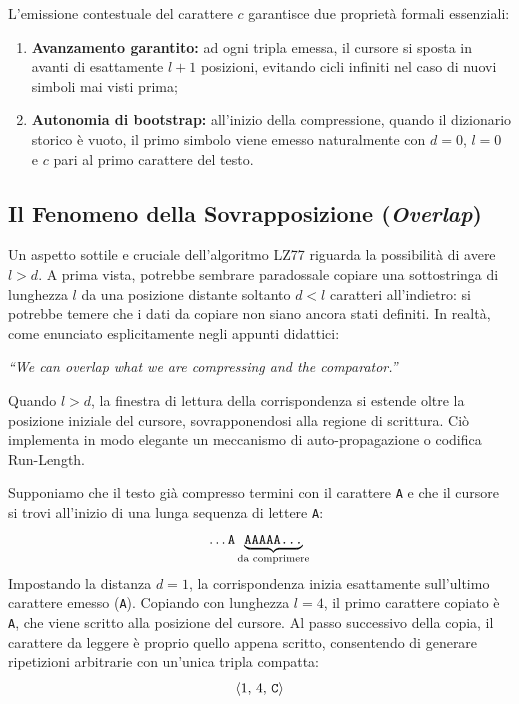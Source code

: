 L'emissione contestuale del carattere $c$ garantisce due propriet\`a formali essenziali:
\begin{enumerate}
  \item \textbf{Avanzamento garantito:} ad ogni tripla emessa, il cursore si sposta in avanti di esattamente $l + 1$ posizioni, evitando cicli infiniti nel caso di nuovi simboli mai visti prima;
  \item \textbf{Autonomia di bootstrap:} all'inizio della compressione, quando il dizionario storico \`e vuoto, il primo simbolo viene emesso naturalmente con $d = 0$, $l = 0$ e $c$ pari al primo carattere del testo.
\end{enumerate}

\FloatBarrier
\subsection{Il Fenomeno della Sovrapposizione (\textit{Overlap})}
\label{subsec:lz77-overlap}

Un aspetto sottile e cruciale dell'algoritmo LZ77 riguarda la possibilit\`a di avere $l > d$. A prima vista, potrebbe sembrare paradossale copiare una sottostringa di lunghezza $l$ da una posizione distante soltanto $d < l$ caratteri all'indietro: si potrebbe temere che i dati da copiare non siano ancora stati definiti. In realt\`a, come enunciato esplicitamente negli appunti didattici:
\begin{center}
  \textit{``We can overlap what we are compressing and the comparator.''}
\end{center}

Quando $l > d$, la finestra di lettura della corrispondenza si estende oltre la posizione iniziale del cursore, sovrapponendosi alla regione di scrittura. Ci\`o implementa in modo elegante un meccanismo di auto-propagazione o codifica Run-Length.

\begin{example}
Supponiamo che il testo gi\`a compresso termini con il carattere \texttt{A} e che il cursore si trovi all'inizio di una lunga sequenza di lettere \texttt{A}:
\begin{equation*}
  \dots \text{\texttt{A}} \underbrace{\text{\texttt{AAAAA\dots}}}_{\text{da comprimere}}
\end{equation*}
Impostando la distanza $d = 1$, la corrispondenza inizia esattamente sull'ultimo carattere emesso (\texttt{A}). Copiando con lunghezza $l = 4$, il primo carattere copiato \`e \texttt{A}, che viene scritto alla posizione del cursore. Al passo successivo della copia, il carattere da leggere \`e proprio quello appena scritto, consentendo di generare ripetizioni arbitrarie con un'unica tripla compatta:
\begin{equation}
  \langle 1, \, 4, \, \text{\texttt{C}} \rangle
\end{equation}
\end{example}

